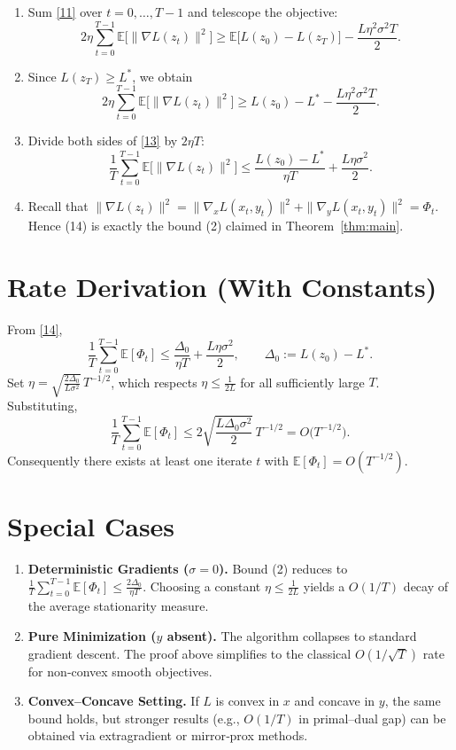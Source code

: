\documentclass{article}
\newcommand{\E}{\mathbb{E}}
\begin{document}
\begin{enumerate}
\item[Step 9.] Sum \eqref{11} over $t=0,\dots,T-1$ and telescope the objective:
\[
2\eta\sum_{t=0}^{T-1}\E\big[\|\nabla L(z_{t})\|^{2}\big]
\ge \E\big[L(z_{0})-L(z_{T})\big]-\frac{L\eta^{2}\sigma^{2}T}{2}.
\tag{12}
\]

\item[Step 10.] Since $L(z_{T})\ge L^{*}$, we obtain
\[
2\eta\sum_{t=0}^{T-1}\E\big[\|\nabla L(z_{t})\|^{2}\big]
\ge L(z_{0})-L^{*}-\frac{L\eta^{2}\sigma^{2}T}{2}.
\tag{13}
\]

\item[Step 11.] Divide both sides of \eqref{13} by $2\eta T$:
\[
\frac{1}{T}\sum_{t=0}^{T-1}\E\big[\|\nabla L(z_{t})\|^{2}\big]
\le \frac{L(z_{0})-L^{*}}{\eta T}+\frac{L\eta\sigma^{2}}{2}.
\tag{14}
\]

\item[Step 12.] Recall that $\|\nabla L(z_{t})\|^{2}
= \|\nabla_{x}L(x_{t},y_{t})\|^{2}+\|\nabla_{y}L(x_{t},y_{t})\|^{2}
= \Phi_{t}$.  Hence (14) is exactly the bound (2) claimed in Theorem~\ref{thm:main}.
\qedhere
\end{enumerate}

\section*{Rate Derivation (With Constants)}
From \eqref{14},
\[
\frac{1}{T}\sum_{t=0}^{T-1}\E[\Phi_{t}]
\le \frac{\Delta_{0}}{\eta T}+ \frac{L\eta\sigma^{2}}{2},
\qquad \Delta_{0}:=L(z_{0})-L^{*}.
\]
Set $\eta = \sqrt{\frac{2\Delta_{0}}{L\sigma^{2}}}\,T^{-1/2}$, which respects $\eta\le \frac{1}{2L}$ for all sufficiently large $T$. Substituting,
\[
\frac{1}{T}\sum_{t=0}^{T-1}\E[\Phi_{t}]
\le 2\sqrt{\frac{L\Delta_{0}\sigma^{2}}{2}}\,T^{-1/2}
= O\!\big(T^{-1/2}\big).
\]
Consequently there exists at least one iterate $t$ with $\E[\Phi_{t}] = O(T^{-1/2})$.

\section*{Special Cases}
\begin{enumerate}[label=\arabic*)]
\item \textbf{Deterministic Gradients ($\sigma=0$).}  
Bound (2) reduces to $\frac{1}{T}\sum_{t=0}^{T-1}\E[\Phi_{t}]\le \frac{2\Delta_{0}}{\eta T}$.
Choosing a constant $\eta\le\frac{1}{2L}$ yields a $O(1/T)$ decay of the average stationarity measure.
\item \textbf{Pure Minimization ($y$ absent).}  
The algorithm collapses to standard gradient descent. The proof above simplifies to the classical $O(1/\sqrt{T})$ rate for non‑convex smooth objectives.
\item \textbf{Convex–Concave Setting.}  
If $L$ is convex in $x$ and concave in $y$, the same bound holds, but stronger results (e.g., $O(1/T)$ in primal–dual gap) can be obtained via extragradient or mirror‑prox methods.
\end{enumerate}
\end{document}
